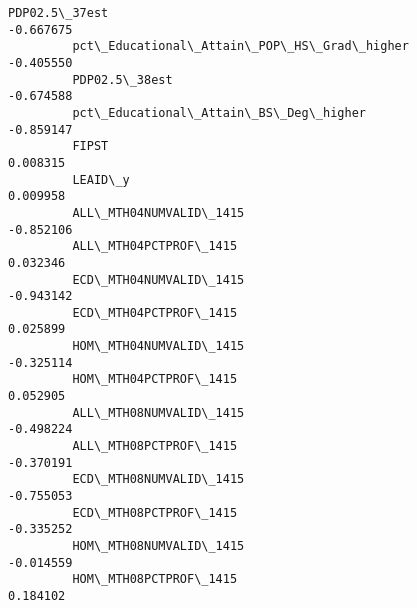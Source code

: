 \documentclass[11pt]{article}
\begin{document}
\begin{Verbatim}[commandchars=\\\{\}]
         PDP02.5\_37est                                                   -0.667675   
         pct\_Educational\_Attain\_POP\_HS\_Grad\_higher                       -0.405550   
         PDP02.5\_38est                                                   -0.674588   
         pct\_Educational\_Attain\_BS\_Deg\_higher                            -0.859147   
         FIPST                                                            0.008315   
         LEAID\_y                                                          0.009958   
         ALL\_MTH04NUMVALID\_1415                                          -0.852106   
         ALL\_MTH04PCTPROF\_1415                                            0.032346   
         ECD\_MTH04NUMVALID\_1415                                          -0.943142   
         ECD\_MTH04PCTPROF\_1415                                            0.025899   
         HOM\_MTH04NUMVALID\_1415                                          -0.325114   
         HOM\_MTH04PCTPROF\_1415                                            0.052905   
         ALL\_MTH08NUMVALID\_1415                                          -0.498224   
         ALL\_MTH08PCTPROF\_1415                                           -0.370191   
         ECD\_MTH08NUMVALID\_1415                                          -0.755053   
         ECD\_MTH08PCTPROF\_1415                                           -0.335252   
         HOM\_MTH08NUMVALID\_1415                                          -0.014559   
         HOM\_MTH08PCTPROF\_1415                                            0.184102   
         

\end{Verbatim}
\end{document}
